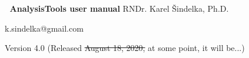 
\begin{center}
\thispagestyle{empty}
\textcolor{white}{.}
\vfill
\vfill
\vfill
{\Huge\bf AnalysisTools user manual}
\vfill
{\Large RNDr. Karel Šindelka, Ph.D.}

{\small k.sindelka@gmail.com}
\vspace{10pt}

\vfill
Version 4.0 (Released \sout{August 18, 2020,} at some point, it will be...)
\vfill
\vfill
\vfill
\vfill
\vfill
\end{center}
\tableofcontents
\setcounter{page}{1}
\thispagestyle{empty}

\pagestyle{main}



% 


